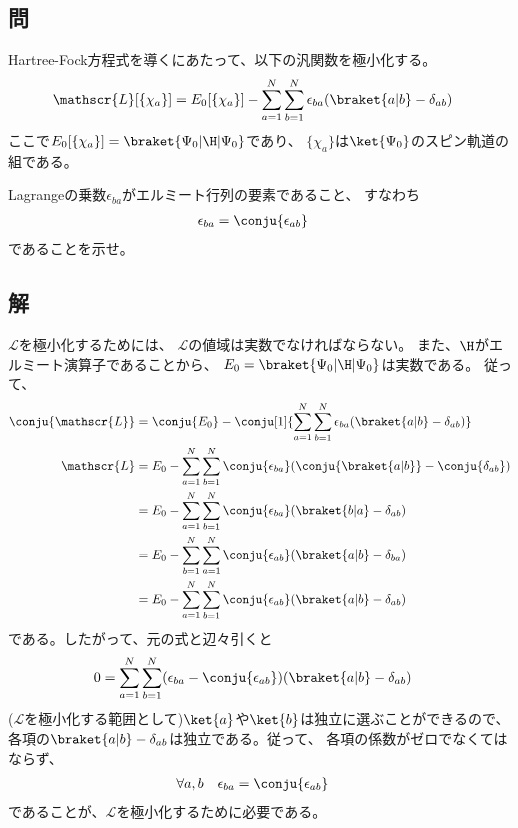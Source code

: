 \subsection{問}
Hartree-Fock方程式を導くにあたって、以下の汎関数を極小化する。
\begin{align}
	\mathscr{L}[\{\chi_a\}]
&=
	E_0[\{\chi_a\}]
	-
	\sum_{a=1}^{N}
	\sum_{b=1}^{N}
		\epsilon_{ba}
		(\braket{a|b}-\delta_{ab})
\end{align}
ここで$E_0[\{\chi_a\}]=\braket{\Psi_0|\H|\Psi_0}$であり、
$\{\chi_a\}$は$\ket{\Psi_0}$のスピン軌道の組である。

Lagrangeの乗数$\epsilon_{ba}$がエルミート行列の要素であること、
すなわち
\begin{align}
	\epsilon_{ba}
&=
	\conju{\epsilon_{ab}}
\end{align}
であることを示せ。


\subsection{解}
$\mathscr{L}$を極小化するためには、
$\mathscr{L}$の値域は実数でなければならない。
また、$\H$がエルミート演算子であることから、
$E_0=\braket{\Psi_0|\H|\Psi_0}$は実数である。
従って、
\begin{align}
	\conju{\mathscr{L}}
&=
	\conju{E_0}
	-
	\conju[1]{
		\sum_{a=1}^{N}
		\sum_{b=1}^{N}
			\epsilon_{ba}
			(\braket{a|b}-\delta_{ab})
	} \\
%
%
	\mathscr{L}
&=
	E_0
	-
	\sum_{a=1}^{N}
	\sum_{b=1}^{N}
		\conju{\epsilon_{ba}}
		(\conju{\braket{a|b}}-\conju{\delta_{ab}}) \\
%
%
&=
	E_0
	-
	\sum_{a=1}^{N}
	\sum_{b=1}^{N}
		\conju{\epsilon_{ba}}
		(\braket{b|a}-\delta_{ab}) \\
%
%
&=
	E_0
	-
	\sum_{b=1}^{N}
	\sum_{a=1}^{N}
		\conju{\epsilon_{ab}}
		(\braket{a|b}-\delta_{ba}) \\
%
%
&=
	E_0
	-
	\sum_{a=1}^{N}
	\sum_{b=1}^{N}
		\conju{\epsilon_{ab}}
		(\braket{a|b}-\delta_{ab})
\end{align}
である。したがって、元の式と辺々引くと
\begin{align}
	0
&=
	\sum_{a=1}^{N}
	\sum_{b=1}^{N}
		(
			\epsilon_{ba}-\conju{\epsilon_{ab}}
		)
		(
			\braket{a|b}-\delta_{ab}
		)
\end{align}
($\mathscr{L}$を極小化する範囲として)$\ket{a}$や$\ket{b}$は独立に選ぶことができるので、
各項の$\braket{a|b}-\delta_{ab}$は独立である。従って、
各項の係数がゼロでなくてはならず、
\begin{align}
	\forall a,b
	\quad
	\epsilon_{ba}
&=
	\conju{\epsilon_{ab}}
\end{align}
であることが、$\mathscr{L}$を極小化するために必要である。
